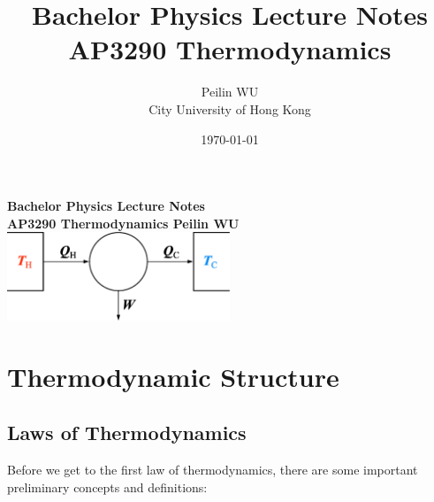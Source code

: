 \documentclass[UTF8]{book}
\newenvironment{theorem}[2][Theorem]{\begin{trivlist}
\item[\hskip \labelsep {\bfseries #1}\hskip \labelsep {\bfseries }]}{\end{trivlist}}
\begin{document}
\date{\today}
\title{ Bachelor Physics Lecture Notes\\ AP3290 Thermodynamics
}
\author{Peilin \textsc{WU}
 \\City University of Hong Kong
 }
 
\frontmatter

\begin{titlepage}
    \centering
    \vfill
    {\bfseries\Large
	Bachelor Physics Lecture Notes\\ 
	AP3290 Thermodynamics
        \vskip2cm
        Peilin \textsc{WU}\\
    }    
    \vfill
    \includegraphics[width=0.5\textwidth]{Carnot_heat_engine.eps} %
    \vfill
    \vfill
\end{titlepage}

\tableofcontents
\mainmatter
\chapter{Thermodynamic Structure}
\epigraph{}{}
\section{Laws of Thermodynamics}

 {Before we get to the first law of thermodynamics, there are some important preliminary concepts and definitions:}

\end{document}
